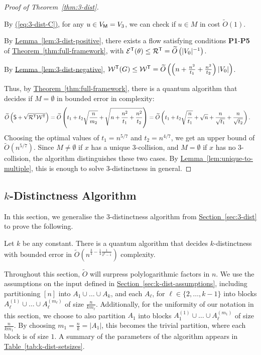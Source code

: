 \documentclass{theoretics}
\newcommand{\eq}[1]{\hyperref[eq:#1]{(\ref*{eq:#1})}}
\renewcommand{\sec}[1]{\hyperref[sec:#1]{Section~\ref*{sec:#1}}}
\newcommand{\thm}[1]{\hyperref[thm:#1]{Theorem~\ref*{thm:#1}}}
\newcommand{\lem}[1]{\hyperref[lem:#1]{Lemma~\ref*{lem:#1}}}
\newcommand{\tabl}[1]{\hyperref[tab:#1]{Table~\ref*{tab:#1}}}
\renewcommand{\>}{\rangle}
\newcommand{\<}{\langle}
\renewcommand{\(}{\left(}
\renewcommand{\)}{\right)}
\def\abs#1{\left| #1 \right|}
\begin{document}
\begin{proof}[Proof of Theorem~\ref{thm:3-dist}]
\begin{description}
\begin{description}
\end{description}

\item[Checking Subroutine:] By \eq{3-dist-C}, for any $u\in V_{\sf M}=V_3$, we can check if $u\in M$ in cost $\widetilde{O}(1)$. 
\item[Positive Condition:] By \lem{3-dist-positive}, there exists a flow satisfying conditions \textbf{P1}-\textbf{P5} of \thm{full-framework}, with ${\cal E}^{\sf T}(\theta)\leq {\cal R}^{\sf T}=\widetilde{O}\left(|V_0|^{-1} \right)$.
\item[Negative Condition:] By \lem{3-dist-negative}, ${\cal W}^{\sf T}(G)\leq {\cal W}^{\sf T}=\widetilde{O}\left(\left(n + \frac{n^2}{t_1} +\frac{n^2}{t_2}\right)|V_0|\right)$. 
\end{description}
Thus, by \thm{full-framework}, there is a quantum algorithm that decides if $M=\emptyset$ in bounded error in complexity:
\begin{align*}
\widetilde{O}\left({\sf S}+\sqrt{{\cal R}^{\sf T}{\cal W}^{\sf T}}\right) &= \widetilde{O}\left(t_1+t_2\sqrt{\frac{n}{m_2}}+\sqrt{n+\frac{n^2}{t_1}+\frac{n^2}{t_2}}\right)
=\widetilde{O}\left( t_1+t_2\sqrt{\frac{n}{t_1}}+\sqrt{n}+\frac{n}{\sqrt{t_1}}+\frac{n}{\sqrt{t_2}}\right).
\end{align*}
Choosing the optimal values of $t_1=n^{5/7}$ and $t_2=n^{4/7}$, we get an upper bound of $\widetilde{O}(n^{5/7})$.
Since $M\neq\emptyset$ if $x$ has a unique 3-collision, and $M=\emptyset$ if $x$ has no 3-collision, the algorithm distinguishes these two cases. By \lem{unique-to-multiple}, this is enough to solve 3-distinctness in general.
\end{proof}


\subsection{\texorpdfstring{$k$}{k}-Distinctness Algorithm}\label{sec:k-dist-alg}

In this section, we generalise the $3$-distinctness algorithm from \sec{3-dist} to prove the following.
\begin{theorem}\label{thm:k-dist}
	Let $k$ be any constant.
	There is a quantum algorithm that decides $k$-distinctness with bounded error in $\widetilde{O}\left(n^{\frac{3}{4}-\frac{1}{4}\frac{1}{2^k-1}}\right)$ complexity.
\end{theorem}
\noindent Throughout this section, $\widetilde{O}$ will surpress polylogarithmic factors in $n$.
We use the assumptions on the input defined in \sec{k-dist-assumptions}, including partitioning $[n]$ into $A_1\cup\dots\cup A_k$, and each $A_{\ell}$, for $\ell\in\{2,\dots, k-1\}$ into blocks $A_{\ell}^{(1)}\cup\dots\cup A_{\ell}^{(m_{\ell})}$ of size $\frac{n}{km_{\ell}}$. Additionally, for the uniformity of our notation in this section, we choose to also partition $A_1$ into blocks $A_{1}^{(1)}\cup\dots\cup A_{\ell}^{(m_{1})}$ of size $\frac{n}{km_{1}}$. By choosing $m_1 = \frac{n}{k} = \abs{A_1}$, this becomes the trivial partition, where each block is of size $1$. A summary of the parameters of the algorithm appears in \tabl{k-dist-setsizes}.
\end{document}
